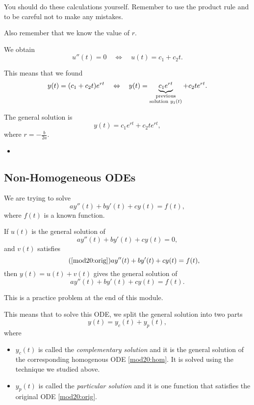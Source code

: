 \begin{important}
You should do these calculations yourself.
Remember to use the product rule and to be careful not to make any mistakes.	

Also remember that we know the value of $r$.
\end{important}

We obtain
$$
u''(t) = 0
\quad \Leftrightarrow \quad u(t) = c_1 + c_2 t.
$$

This means that we found 
$$
y(t) = (c_1 + c_2 t) e^{rt}
\quad \Leftrightarrow \quad y(t) = \underbrace{c_1 e^{rt}}_{\substack{\rm previous \\ \text{solution } y_1(t)}} + c_2 t e^{rt}.
$$

The general solution is 
$$
y(t) = c_1 e^{rt} + c_2 t e^{rt},
$$
where $r = -\frac{b}{2a}$.


\begin{video}
\begin{itemize}
	\item {}
\end{itemize}	
\end{video}






\subsection{Non-Homogeneous ODEs}

We are trying to solve
\begin{equation}\tag{$\star$}\label{mod20:orig}
a y''(t)  + b y'(t) + c y(t) = f(t),
\end{equation}
where $f(t)$ is a known function. \\


\begin{important}
If $u(t)$ is the general solution of
\begin{equation}\tag{$H$}\label{mod20:hom}
ay''(t)+by'(t)+cy(t) = 0,
\end{equation}
and $v(t)$ satisfies
\begin{equation}\tag{\ref{mod20:orig}}
ay''(t)+by'(t)+cy(t) = f(t),
\end{equation}
then $y(t) = u(t) + v(t)$ gives the general solution of
$$
ay''(t)+by'(t)+cy(t) = f(t).
$$

This is a practice problem at the end of this module.
\end{important}


This means that to solve this ODE, we split the general solution into two parts
$$
y(t) = y_c(t) + y_p(t),
$$
where
\begin{itemize}
	\item $y_c(t)$ is called the \emph{complementary solution} and it is the general solution of the corresponding homogenous ODE \eqref{mod20:hom}. It is solved using the technique we studied above.
	\item $y_p(t)$ is called the \emph{particular solution} and it is one function that satisfies the original ODE \eqref{mod20:orig}.
\end{itemize}

